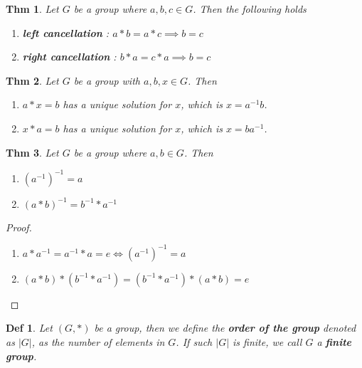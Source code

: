 \documentclass[paper=a4, fontsize=11pt]{scrartcl}
\newtheorem{theorem}{Thm}
\newtheorem{definition}{Def}
\begin{document}
\begin{theorem}
	Let $G$ be a group where $a,b,c \in G$. Then the following holds 
	\begin{enumerate}
		\item \textbf{left cancellation} : $a \ast b = a \ast c \implies b =c$
		\item \textbf{right cancellation} : $b \ast a = c \ast a \implies b = c$ \\
	\end{enumerate}
\end{theorem}

\begin{theorem}
	Let $G$ be a group with $a,b,x \in G$. Then 
	\begin{enumerate}
		\item $a \ast x = b$ has a unique solution for $x$, which is $x= a^{-1} b$.
		\item $x \ast a = b$ has a unique solution for $x$, which is $x=b a^{-1}$.\\
	\end{enumerate}
\end{theorem}

\begin{theorem}
	Let $G$ be a group where $a,b \in G$. Then
	\begin{enumerate}
		\item $(a^{-1})^{-1} = a$
		\item $(a \ast b)^{-1} = b^{-1} \ast a^{-1}$\\
	\end{enumerate}
\end{theorem}

\begin{proof}
$ $ \newline
\vspace{-0.15in}
\begin{enumerate}
	\item  $a \ast a^{-1} = a^{-1} \ast a = e \iff (a^{-1})^{-1} = a$
	\item $(a \ast b)\ast(b^{-1} \ast a^{-1}) = (b^{-1} \ast a^{-1}) \ast (a \ast b) = e$
\end{enumerate}
\end{proof}

\begin{definition}
	Let $(G,\ast)$ be a group, then we define the \textbf{order of the group} denoted as $|G|$, as the number of elements in $G$. If such $|G|$ is finite, we call $G$ a \textbf{finite group}.\\
\end{definition}
\end{document}
